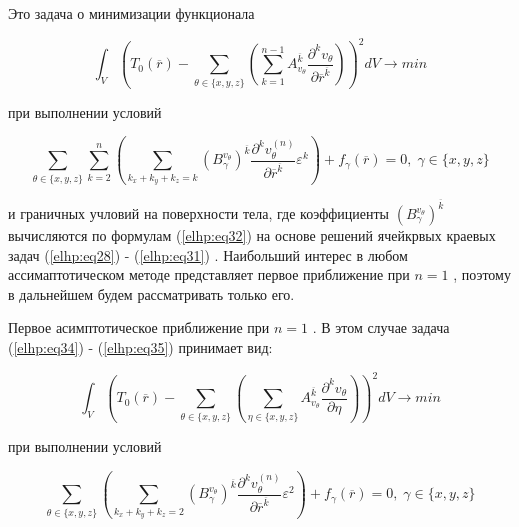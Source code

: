 Это задача о минимизации функционала

\begin{equation}
    \label{elhp:eq34}
    \int_V \left( 
    T_0 \left( \overline{r}  \right) - 
    \sum_{ \theta \in \{x,y,z\} } \left( 
        \sum^{n-1}_{k=1} A_{v_{\theta}}^{ \overline{k} } \frac{\partial^k v_{\theta}}{\partial \overline{r}^{ \overline{k} } } 
    \right)   \right)^2
    dV \rightarrow min
\end{equation}

при выполнении условий

\begin{equation}
    \label{elhp:eq35}
    \sum_{ \theta \in \{x,y,z\} } \sum_{k=2}^{n}
    \left( 
        \sum_{k_x+k_y+k_z = k}
        \left( B_{\gamma}^{v_{\theta}} \right)^{ \overline{k} }
        \frac{\partial^k v_{\theta}^{(n)}}{\partial \overline{r}^{ \overline{k}}}
        \varepsilon^k
    \right) 
    + f_{ \gamma} \left( \overline{r}  \right) = 0
    ,\;
    \gamma \in \{x,y,z\} 
\end{equation}

и граничных учловий на поверхности тела, где коэффициенты 
$\left( B_{\gamma}^{v_{\theta}} \right)^{ \overline{k} }$ 
вычисляются по формулам 
(\ref{elhp:eq32})
на основе решений ячейкрвых краевых задач 
(\ref{elhp:eq28})
-
(\ref{elhp:eq31})
.
Наибольший интерес в любом ассимаптотическом методе представляет первое приближение при 
$n=1$
, поэтому в дальнейшем будем рассматривать
только его.

Первое асимптотическое приближение при 
$n=1$
. В этом случае задача 
(\ref{elhp:eq34})
-
(\ref{elhp:eq35})
принимает вид:

\begin{equation}
    \label{elhp:eq36}
    \int_V \left( 
    T_0 \left( \overline{r}  \right) - 
    \sum_{ \theta \in \{x,y,z\} } \left( 
        \sum_{ \eta \in \{x,y,z\} } A_{v_{\theta}}^{ \overline{k} } \frac{\partial^k v_{\theta}}{\partial \eta } 
    \right)   \right)^2
    dV \rightarrow min
\end{equation}

при выполнении условий

\begin{equation}
    \label{elhp:eq37}
    \sum_{ \theta \in \{x,y,z\} } 
    \left( 
        \sum_{k_x+k_y+k_z = 2}
        \left( B_{\gamma}^{v_{\theta}} \right)^{ \overline{k} }
        \frac{\partial^k v_{\theta}^{(n)}}{\partial \overline{r}^{ \overline{k}}}
        \varepsilon^2
    \right) 
    + f_{ \gamma} \left( \overline{r}  \right) = 0
    ,\;
    \gamma \in \{x,y,z\} 
\end{equation}

